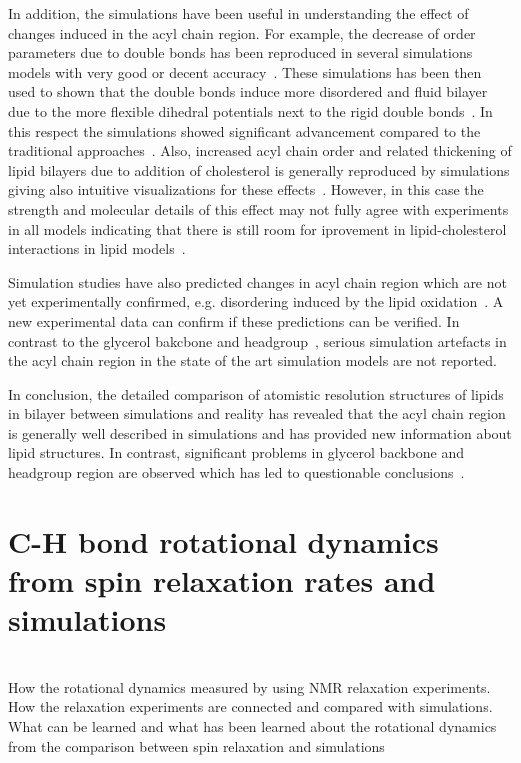 \documentclass[aps,prl,superscriptaddress,twocolumn]{revtex4}
\begin{document}
In addition, the simulations have been useful in understanding the effect of changes induced 
in the acyl chain region. For example, the decrease of order parameters due to double bonds 
has been reproduced in several simulations models with very good or decent accuracy~\cite{??}.
These simulations has been then used to shown that the double bonds induce more disordered
and fluid bilayer due to the more flexible dihedral potentials next to the rigid double bonds~\cite{??}.
In this respect the simulations showed significant advancement compared to the traditional 
approaches~\cite{??}. Also, increased acyl chain order and related thickening
of lipid bilayers due to addition of cholesterol is generally reproduced by simulations giving
also intuitive visualizations for these effects~\cite{??}. However, in this case the 
strength and molecular details of this effect may not fully agree with experiments in all models
indicating that there is still room for iprovement in lipid-cholesterol interactions in lipid
models~\cite{??}.

Simulation studies have also predicted changes in acyl chain region which are not yet experimentally 
confirmed, e.g. disordering induced by the lipid oxidation~\cite{??}. A new experimental data
can confirm if these predictions can be verified. In contrast to the glycerol bakcbone and headgroup~\cite{??},
serious simulation artefacts in the acyl chain region in the state of the art simulation models are
not reported. 

In conclusion, the detailed comparison of atomistic resolution structures of lipids in bilayer between 
simulations and reality has revealed that the acyl chain region is generally well described in simulations
and has provided new information about lipid structures. In contrast, significant problems
in glycerol backbone and headgroup region are observed which has led to questionable conclusions~\cite{??}.

\section{C-H bond rotational dynamics from spin relaxation rates and simulations}

\\[0.1cm]

\noindent How the rotational dynamics measured by using NMR relaxation experiments. \\
How the relaxation experiments are connected and compared with simulations. \\
What can be learned and what has been learned about the rotational dynamics from the comparison between spin relaxation and simulations \\[0.5 cm]
\end{document}
